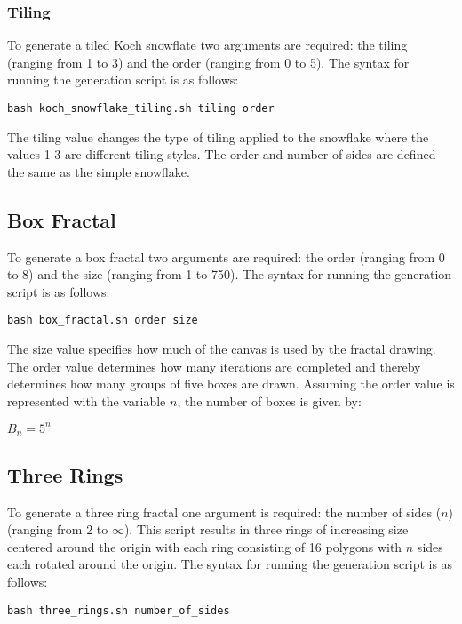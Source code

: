 \documentclass{article}
\begin{document}
    \subsubsection*{Tiling}
      To generate a tiled Koch snowflate two arguments are required: the tiling (ranging from 1 to 3) and the order (ranging from 0 to 5). The syntax for running the generation script is as follows:
      \begin{center}
        \texttt{bash koch\_snowflake\_tiling.sh tiling order}
      \end{center}
      The tiling value changes the type of tiling applied to the snowflake where the values 1-3 are different tiling styles. The order and number of sides are defined the same as the simple snowflake.
    \subsection*{Box Fractal}
      To generate a box fractal two arguments are required: the order (ranging from 0 to 8) and the size (ranging from 1 to 750). The syntax for running the generation script is as follows:
      \begin{center}
        \texttt{bash box\_fractal.sh order size}
      \end{center}
      The size value specifies how much of the canvas is used by the fractal drawing. The order value determines how many iterations are completed and thereby determines how many groups of five boxes are drawn. Assuming the order value is represented with the variable $n$, the number of boxes is given by:
      \begin{center}
        $B_n = 5^n$
      \end{center}
    \subsection*{Three Rings}
      To generate a three ring fractal one argument is required: the number of sides ($n$) (ranging from 2 to $\infty$). This script results in three rings of increasing size centered around the origin with each ring consisting of 16 polygons with $n$ sides each rotated around the origin. The syntax for running the generation script is as follows:
      \begin{center}
        \texttt{bash three\_rings.sh number\_of\_sides}
      \end{center}
\end{document}
